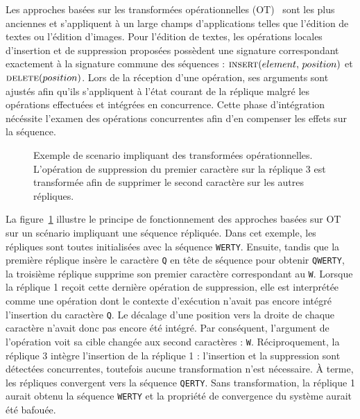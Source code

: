 Les approches basées sur les transformées opérationnelles
(OT)~\cite{sun1998operational, sun2009contextbased} sont les plus anciennes et
s'appliquent à un large champs d'applications telles que l'édition de textes ou
l'édition d'images. Pour l'édition de textes, les opérations locales d'insertion
et de suppression proposées possèdent une signature correspondant exactement à
la signature commune des séquences : $\textsc{insert}(element,\, position)$ et
$\textsc{delete}(position)$. Lors de la réception d'une opération, ses arguments
sont ajustés afin qu'ils s'appliquent à l'état courant de la réplique malgré les
opérations effectuées et intégrées en concurrence. Cette phase d'intégration
nécéssite l'examen des opérations concurrentes afin d'en compenser les effets
sur la séquence.


\begin{figure}
  \centering
  
  \caption[Exemple de transformées opérationnelles] {\label{repl:fig:otexample}
    Exemple de scenario impliquant des transformées opérationnelles. L'opération
    de suppression du premier caractère sur la réplique 3 est transformée afin
    de supprimer le second caractère sur les autres répliques.}
\end{figure}

La figure~\ref{repl:fig:otexample} illustre le principe de fonctionnement des
approches basées sur OT sur un scénario impliquant une séquence répliquée. Dans
cet exemple, les répliques sont toutes initialisées avec la séquence
\texttt{WERTY}. Ensuite, tandis que la première réplique insère le caractère
\texttt{Q} en tête de séquence pour obtenir \texttt{QWERTY}, la troisième
réplique supprime son premier caractère correspondant au \texttt{W}. Lorsque la
réplique 1 reçoit cette dernière opération de suppression, elle est interprétée
comme une opération dont le contexte d'exécution n'avait pas encore intégré
l'insertion du caractère \texttt{Q}. Le décalage d'une position vers la droite
de chaque caractère n'avait donc pas encore été intégré. Par conséquent,
l'argument de l'opération voit sa cible changée aux second caractères :
\texttt{W}.  Réciproquement, la réplique 3 intègre l'insertion de la réplique 1
: l'insertion et la suppression sont détectées concurrentes, toutefois aucune
transformation n'est nécessaire. À terme, les répliques convergent vers la
séquence \texttt{QERTY}. Sans transformation, la réplique 1 aurait obtenu la
séquence \texttt{WERTY} et la propriété de convergence du système aurait été
bafouée.

